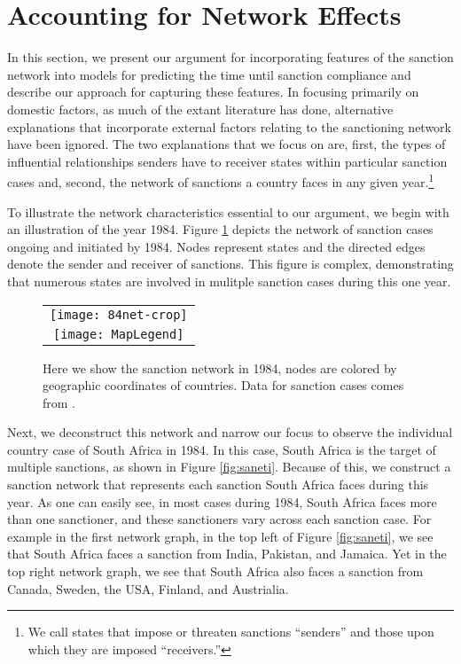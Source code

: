\section*{Accounting for Network Effects}
\label{neteffects}

In this section, we present our argument for incorporating features of the sanction network into models for predicting the time until sanction compliance and describe our approach for capturing these features. In focusing primarily on domestic factors, as much of the extant literature has done, alternative explanations that incorporate external factors relating to the sanctioning network have been ignored. The two explanations that we focus on are, first, the types of influential relationships senders have to receiver states within particular sanction cases and, second, the network of sanctions a country faces in any given year.\footnote{We call states that impose or threaten sanctions “senders” and those upon which they are imposed “receivers.”}

To illustrate the network characteristics essential to our argument, we begin with an illustration of the year 1984. Figure \ref{fig:spaghetti} depicts the network of sanction cases ongoing and initiated by 1984. Nodes represent states and the directed edges denote the sender and receiver of sanctions. This figure is complex, demonstrating that numerous states are involved in mulitple sanction cases during this one year.

\begin{figure}[ht]
  \centering
  \begin{tabular}{c}
	  \texttt{[image: 84net-crop]} \\
	  \texttt{[image: MapLegend]}
  \end{tabular}
  \caption{Here we show the sanction network in 1984, nodes are colored by geographic coordinates of countries. Data for sanction cases comes from \citet{morgan2009threat}.}
  \label{fig:spaghetti}
\end{figure}
\FloatBarrier

Next, we deconstruct this network and narrow our focus to observe the individual country case of South Africa in 1984. In this case, South Africa is the target of multiple sanctions, as shown in Figure \ref{fig:saneti}. Because of this, we construct a sanction network that represents each sanction South Africa faces during this year. As one can easily see, in most cases during 1984, South Africa faces more than one sanctioner, and these sanctioners vary across each sanction case. For example in the first network graph, in the top left of Figure \ref{fig:saneti}, we see that South Africa faces a sanction from India, Pakistan, and Jamaica. Yet in the top right network graph, we see that South Africa also faces a sanction from Canada, Sweden, the USA, Finland, and Austrialia. 

